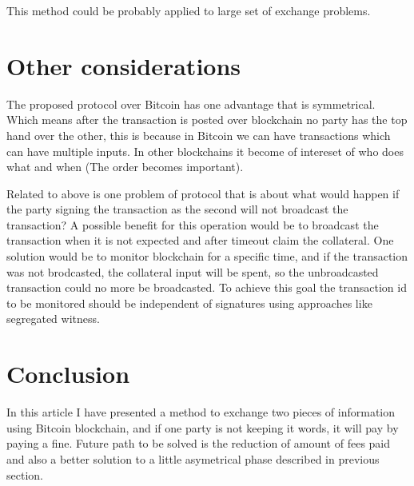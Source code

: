 \documentclass[]{article}
\begin{document}
This method could be probably applied to large set of exchange problems.

\section{Other considerations}

The proposed protocol over Bitcoin has one advantage that is symmetrical. Which means after the transaction is posted over blockchain no party has the top hand over the other, this is because in Bitcoin we can have transactions which can have multiple inputs. In other blockchains it become of intereset of who does what and when (The order becomes important).

Related to above is one problem of protocol that is about what would happen if the party signing the transaction as the second will not broadcast the transaction? A possible benefit for this operation would be to broadcast the transaction when it is not expected and after timeout claim the collateral. One solution would be to monitor blockchain for a specific time, and if the transaction was not brodcasted, the collateral input will be spent, so the unbroadcasted transaction could no more be broadcasted. To achieve this goal the transaction id to be monitored should be independent of signatures using approaches like segregated witness\cite{segwit}.

\section{Conclusion}

In this article I have presented a method to exchange two pieces of information using Bitcoin blockchain, and if one party is not keeping it words, it will pay by paying a fine. Future path to be solved is the reduction of amount of fees paid and also a better solution to a little asymetrical phase described in previous section.
\end{document}
